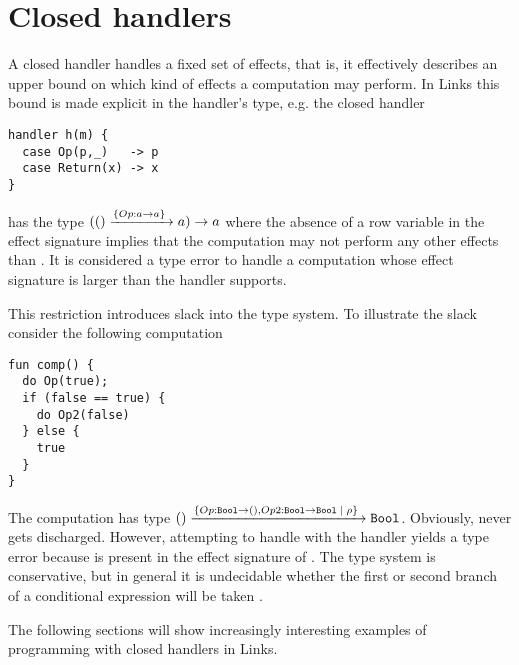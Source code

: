 \section{Closed handlers}\label{sec:closedhandlers}
A closed handler handles a fixed set of effects, that is, it effectively describes an upper bound on which kind of effects a computation may perform. In Links this bound is made explicit in the handler's type, e.g. the closed handler 
\begin{lstlisting}[style=links]
handler h(m) {
  case Op(p,_)   -> p
  case Return(x) -> x
}
\end{lstlisting}
has the type $(() \xrightarrow{\left\{Op : a \to a \right\}\;} a) \to a$ where the absence of a row variable in the effect signature implies that the computation  may not perform any other effects than . It is considered a type error to handle a computation whose effect signature is larger than the handler supports. 

This restriction introduces slack into the type system. To illustrate the slack consider the following computation
\begin{lstlisting}[style=links]
fun comp() {
  do Op(true);
  if (false == true) {
    do Op2(false)
  } else { 
    true
  }
}
\end{lstlisting}
The computation  has type $() \xrightarrow{\left\{Op:\texttt{Bool} \to (),Op2:\texttt{Bool} \to \texttt{Bool} \; | \; \rho \right\}\;} \texttt{Bool}$. Obviously,  never gets discharged. However, attempting to handle  with the handler  yields a type error because  is present in the effect signature of . The type system is conservative, but in general it is undecidable whether the first or second branch of a conditional expression will be taken \cite{Huttel2010}.

The following sections will show increasingly interesting examples of programming with closed handlers in Links.

